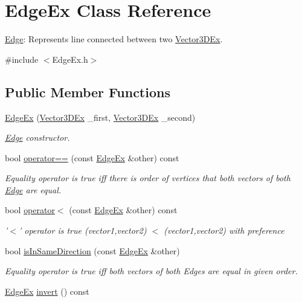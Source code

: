 \hypertarget{class_edge_ex}{
\section{\-Edge\-Ex \-Class \-Reference}
\label{class_edge_ex}
}


\hyperlink{class_edge}{\-Edge}\-: \-Represents line connected between two \hyperlink{class_vector3_d_ex}{\-Vector3\-D\-Ex}.  




{\ttfamily \#include $<$\-Edge\-Ex.\-h$>$}

\subsection*{\-Public \-Member \-Functions}
\begin{DoxyCompactItemize}
\item 
\hyperlink{class_edge_ex_a23005d7db4a82b8cc263b92506a15b12}{\-Edge\-Ex} (\hyperlink{class_vector3_d_ex}{\-Vector3\-D\-Ex} \-\_\-first, \hyperlink{class_vector3_d_ex}{\-Vector3\-D\-Ex} \-\_\-second)
\begin{DoxyCompactList}\small\item\em \hyperlink{class_edge}{\-Edge} constructor. \end{DoxyCompactList}\item 
bool \hyperlink{class_edge_ex_ad7dccb3d4fa8153e8fbc100361facd30}{operator==} (const \hyperlink{class_edge_ex}{\-Edge\-Ex} \&other) const 
\begin{DoxyCompactList}\small\item\em \-Equality operator is true iff there is order of vertices that both vectors of both \hyperlink{class_edge}{\-Edge} are equal. \end{DoxyCompactList}\item 
bool \hyperlink{class_edge_ex_acbd29703c65fadd85b1ecb9856a7e425}{operator$<$} (const \hyperlink{class_edge_ex}{\-Edge\-Ex} \&other) const 
\begin{DoxyCompactList}\small\item\em '$<$' operator is true (vector1,vector2) $<$ (vector1,vector2) with preference \end{DoxyCompactList}\item 
bool \hyperlink{class_edge_ex_a25bcbdb8000c8f3ff3eed580cdb8f53b}{is\-In\-Same\-Direction} (const \hyperlink{class_edge_ex}{\-Edge\-Ex} \&other)
\begin{DoxyCompactList}\small\item\em \-Equality operator is true iff both vectors of both \-Edges are equal in given order. \end{DoxyCompactList}\item 
\hyperlink{class_edge_ex}{\-Edge\-Ex} \hyperlink{class_edge_ex_a3a88d4d1eaeb7a3efb5aa5d0c230c9de}{invert} () const 
\end{DoxyCompactItemize}


